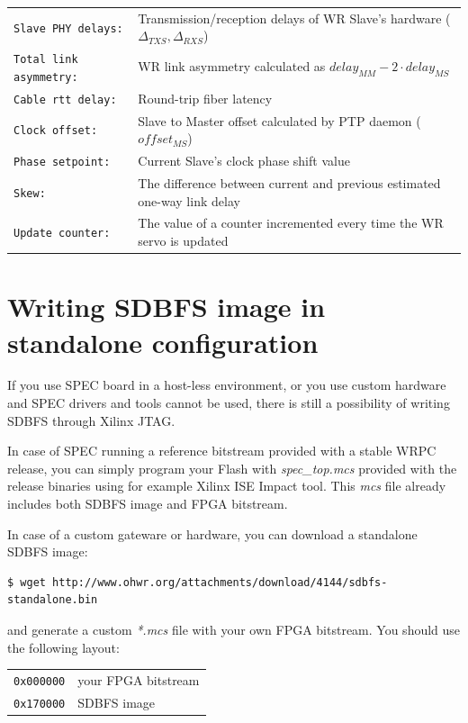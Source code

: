 \documentclass[a4paper, 12pt]{article}
\newcommand{\code}[1]{\texttt{#1}}
\begin{document}
\begin{longtable}{  p{4.5cm}  p{10cm} }
  \code{Slave PHY delays:} & Transmission/reception delays of WR Slave's
    hardware ($\Delta_{TXS}, \Delta_{RXS}$)\\

  \code{Total link asymmetry:} & WR link asymmetry calculated as
    $delay_{MM} - 2 \cdot delay_{MS}$\\

  \code{Cable rtt delay:} & Round-trip fiber latency\\

  \code{Clock offset:} & Slave to Master offset calculated by PTP daemon
  ($ offset_{MS} $)\\

  \code{Phase setpoint:} & Current Slave's clock phase shift value\\

  \code{Skew:} & The difference between current and previous estimated
    one-way link delay\\

  \code{Update counter:} & The value of a counter incremented every time
    the WR servo is updated\\

\end{longtable}
\renewcommand\arraystretch{1}


\clearpage
\section{Writing SDBFS image in standalone configuration}
\label{Writing SDBFS image in standalone configuration}

If you use SPEC board in a host-less environment, or you use custom
hardware and SPEC drivers and tools cannot be used, there is still a
possibility of writing SDBFS through Xilinx JTAG.

\vspace{1em}
In case of SPEC running a reference bitstream provided with a stable
WRPC release, you can simply program your Flash with \textit{spec\_top.mcs}
provided with the release binaries using for example Xilinx ISE Impact tool.
This \textit{mcs} file already includes both SDBFS image and FPGA bitstream.

In case of a custom gateware or hardware, you can download a standalone
SDBFS image:
\begin{lstlisting}
$ wget http://www.ohwr.org/attachments/download/4144/sdbfs-standalone.bin
\end{lstlisting}
and generate a custom \textit{*.mcs} file with your own FPGA bitstream. You should
use the following layout:
\begin{longtable}{  l  l }
\code{0x000000} & your FPGA bitstream \\
\code{0x170000} & SDBFS image\\
\end{longtable}
\end{document}
